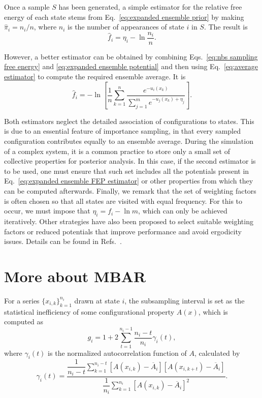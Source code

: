 \documentclass[aip,jcp,reprint,amsmath,amssymb]{revtex4-1}
\begin{document}
Once a sample $S$ has been generated, a simple estimator for the relative free energy of each state stems from Eq.~\eqref{eq:expanded ensemble prior} by making $\hat \pi_i = n_i/n$, where $n_i$ is the number of appearances of state $i$ in $S$. The result is
\begin{equation}
\hat f_i = \eta_i - \ln \frac{n_i}{n}.
\end{equation}

However, a better estimator can be obtained by combining Eqs.~\eqref{eq:nbs sampling free energy} and \eqref{eq:expanded ensemble potential} and then using Eq.~\eqref{eq:average estimator} to compute the required ensemble average. It is
\begin{equation}
\hat f_i = -\ln \left[ \frac{1}{n}\sum_{k=1}^n \frac{e^{-u_i(x_k)}}{\sum_{j=1}^m e^{-u_j(x_k) + \eta_j}} \right].
\end{equation}

Both estimators neglect the detailed association of configurations to states. This is due to an essential feature of importance sampling, in that every sampled configuration contributes equally to an ensemble average. During the simulation of a complex system, it is a common practice to store only a small set of collective properties for posterior analysis. In this case, if the second estimator is to be used, one must ensure that such set includes all the potentials present in Eq.~\eqref{eq:expanded ensemble FEP estimator} or other properties from which they can be computed afterwards. Finally, we remark that the set of weighting factors is often chosen so that all states are visited with equal frequency. For this to occur, we must impose that $\eta_i = f_i - \ln m$, which can only be achieved iteratively. Other strategies have also been proposed to select suitable weighting factors or reduced potentials that improve performance and avoid ergodicity issues. Details can be found in Refs.~.

\section{More about MBAR}
\label{sec:subsampling and uncertainty in MBAR}

For a series $\{x_{i,k}\}_{k=1}^{n_i}$ drawn at state $i$, the subsampling interval is set as the statistical inefficiency of some configurational property $A(x)$, which is computed as\cite{Chodera_2007}
\begin{equation}
\label{eq:statistical inefficiency}
g_i = 1 + 2 \sum\limits_{t=1}^{n_i-1} \frac{n_i - t}{n_i} \gamma_i(t),
\end{equation}
where $\gamma_i(t)$ is the normalized autocorrelation function of $A$, calculated by
\begin{equation*}
\gamma_i(t) = \frac{\dfrac{1}{n_i - t} \sum\limits_{k=1}^{n_i-t} \left[A(x_{i,k}) - \overline A_i\right]\left[A(x_{i,k+t}) - \overline A_i\right]}{\dfrac{1}{n_i} \sum\limits_{k=1}^{n_i} \left[A(x_{i,k}) - \overline A_i\right]^2}.
\end{equation*}
\end{document}
